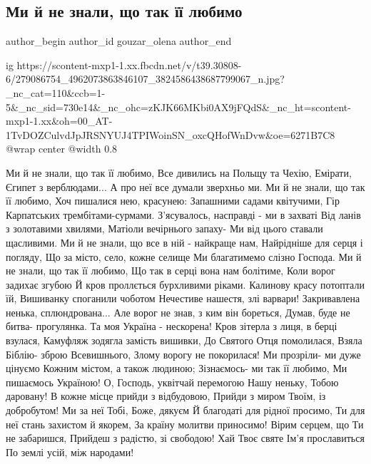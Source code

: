  
 
 
 
 
 
\subsection{Ми й не знали, що так її любимо}
\label{sec:26_04_2022.fb.gouzar_olena.1.ne_znaly_scho_tak_ii_ljubymo}
 
\ifcmt
 author_begin
   author_id gouzar_olena
 author_end
\fi


\ifcmt
  ig https://scontent-mxp1-1.xx.fbcdn.net/v/t39.30808-6/279086754_4962073863846107_3824586438687799067_n.jpg?_nc_cat=110&ccb=1-5&_nc_sid=730e14&_nc_ohc=zKJK66MKbi0AX9jFQdS&_nc_ht=scontent-mxp1-1.xx&oh=00_AT-1TvDOZCulvdJpJRSNYUJ4TPIWoinSN_oxcQHofWnDvw&oe=6271B7C8
  @wrap center
  @width 0.8
\fi

\raggedcolumns
\begin{multicols}{3} %
\setlength{\parindent}{0pt}

\obeycr
Ми й не знали, що так її любимо,
Все дивились на Польщу та Чехію,
Емірати, Єгипет з верблюдами...
А про неї все думали зверхньо ми.
\smallskip
Ми й не знали, що так її любимо,
Хоч пишалися нею, красунею:
Запашними садами квітучими,
Гір Карпатських трембітами-сурмами.
\smallskip
З'ясувалось, насправді - ми в захваті
Від ланів з золотавими хвилями,
Матіоли вечірнього запаху-
Ми від цього ставали щасливими.
\smallskip
Ми й не знали, що все в ній - найкраще нам,
Найрідніше для серця і погляду,
Що за місто, село, кожне селище
Ми благатимемо слізно Господа.
\smallskip
Ми й не знали, що так її любимо,
Що так в серці вона нам болітиме,
Коли ворог задихає згубою
Й кров проллється бурхливими ріками.
\smallskip
Калинову красу потоптали їй,
Вишиванку споганили чоботом
Нечестиве нашестя, злі варвари!
Закривавлена ненька, сплюндрована...
\smallskip
Але ворог не знав, з ким він бореться,
Думав, буде не битва- прогулянка.
Та моя Україна - нескорена!
\smallskip
Кров зітерла з лиця, в берці взулася,
Камуфляж зодягла замість вишивки,
До Святого Отця помолилася,
Взяла Біблію- зброю Всевишнього,
Злому ворогу не покорилася!
\smallskip
Ми прозріли- ми дуже цінуємо
Кожним містом, а також людиною;
Зізнаємось- ми так її любимо,
Ми пишаємось Україною!
\smallskip
О, Господь, уквітчай перемогою
Нашу неньку, Тобою даровану!
В кожне місце прийди з відбудовою,
Прийди з миром Твоїм, із добробутом!
\smallskip
Ми за неї Тобі, Боже, дякуєм
Й благодаті для рідної просимо,
Ти для неї стань захистом й якорем,
За країну молитви приносимо!
\smallskip
Вірим серцем, що Ти не забаришся,
Прийдеш з радістю, зі свободою!
Хай Твоє святе Ім'я прославиться
По землі усій, між народами!
\restorecr

\end{multicols} %
